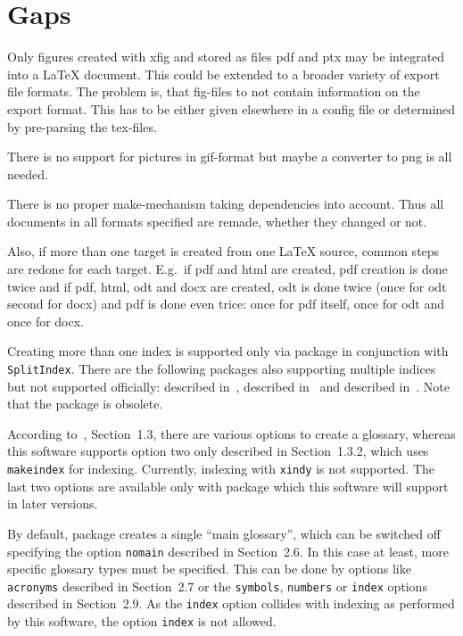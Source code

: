 \chapter{Gaps}\label{chap:gaps}

Only figures created with xfig and stored as files pdf and ptx 
may be integrated into a \LaTeX{} document. 
This could be extended to a broader variety of export file formats. 
The problem is, that fig-files to not contain information on the export
format. 
This has to be either given elsewhere in a config file 
or determined by pre-parsing the tex-files. 

There is no support for pictures in \gls{gif}-format 
but maybe a converter to \gls{png} is all needed. 

There is no proper make-mechanism taking dependencies into account. 
Thus all documents in all formats specified are remade, 
whether they changed or not. 

Also, if more than one target is created from one \LaTeX{} source, 
common steps are redone for each target. 
E.g.~if pdf and html are created, 
pdf creation is done twice and if pdf, html, odt and docx are created, 
odt is done twice (once for odt second for docx) 
and pdf is done even trice: 
once for pdf itself, once for odt and once for docx. 

Creating more than one index is supported only 
via package  in conjunction with \texttt{SplitIndex}. 
There are the following packages also supporting multiple indices 
but not supported officially: 
 described in~\cite{IndexP}, 
 described in~\cite{AmsmidxP} and 
 described in~\cite{ImakeidxP}.
Note that the package  is obsolete. 

According to~\cite{GloP4_54}, Section~1.3, 
there are various options to create a glossary, 
whereas this software supports option two only described in Section~1.3.2, 
which uses \texttt{makeindex} for indexing. 
Currently, indexing with \texttt{xindy} is not supported. 
The last two options are available only with package  
which this software will support in later versions. 

By default, package  creates a single ``main glossary'', 
which can be switched off specifying the option \texttt{nomain} 
described in Section~2.6. 
In this case at least, more specific glossary types must be specified. 
This can be done by options like \texttt{acronyms} described in Section~2.7 
or the \texttt{symbols},
\texttt{numbers} or \texttt{index} options described in Section~2.9. 
As the \texttt{index} option collides with indexing as performed by this software, 
the option \texttt{index} is not allowed. 

